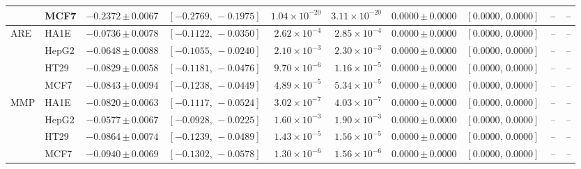 \documentclass[11pt,a4paper]{article}
\begin{document}
\begin{landscape}
\begin{table}[p]
{\begin{tabular}{@{}llrrrrrrrr@{}}
& MCF7
& \(-0.2372\,{\scriptstyle\pm\,0.0067}\)
& \([-0.2769,\,-0.1975]\)
& \(1.04\times10^{-20}\)
& \(3.11\times10^{-20}\)
& \(0.0000\,{\scriptstyle\pm\,0.0000}\)
& \([0.0000,\,0.0000]\)
& \textit{--}
& \textit{--} \\

\midrule

\multirow[c]{4}{*}{ARE}
& HA1E
& \(-0.0736\,{\scriptstyle\pm\,0.0078}\)
& \([-0.1122,\,-0.0350]\)
& \(2.62\times10^{-4}\)
& \(2.85\times10^{-4}\)
& \(0.0000\,{\scriptstyle\pm\,0.0000}\)
& \([0.0000,\,0.0000]\)
& \textit{--}
& \textit{--} \\

& HepG2
& \(-0.0648\,{\scriptstyle\pm\,0.0088}\)
& \([-0.1055,\,-0.0240]\)
& \(2.10\times10^{-3}\)
& \(2.30\times10^{-3}\)
& \(0.0000\,{\scriptstyle\pm\,0.0000}\)
& \([0.0000,\,0.0000]\)
& \textit{--}
& \textit{--} \\

& HT29
& \(-0.0829\,{\scriptstyle\pm\,0.0058}\)
& \([-0.1181,\,-0.0476]\)
& \(9.70\times10^{-6}\)
& \(1.16\times10^{-5}\)
& \(0.0000\,{\scriptstyle\pm\,0.0000}\)
& \([0.0000,\,0.0000]\)
& \textit{--}
& \textit{--} \\

& MCF7
& \(-0.0843\,{\scriptstyle\pm\,0.0094}\)
& \([-0.1238,\,-0.0449]\)
& \(4.89\times10^{-5}\)
& \(5.34\times10^{-5}\)
& \(0.0000\,{\scriptstyle\pm\,0.0000}\)
& \([0.0000,\,0.0000]\)
& \textit{--}
& \textit{--} \\

\midrule

\multirow[c]{4}{*}{MMP}
& HA1E
& \(-0.0820\,{\scriptstyle\pm\,0.0063}\)
& \([-0.1117,\,-0.0524]\)
& \(3.02\times10^{-7}\)
& \(4.03\times10^{-7}\)
& \(0.0000\,{\scriptstyle\pm\,0.0000}\)
& \([0.0000,\,0.0000]\)
& \textit{--}
& \textit{--} \\

& HepG2
& \(-0.0577\,{\scriptstyle\pm\,0.0067}\)
& \([-0.0928,\,-0.0225]\)
& \(1.60\times10^{-3}\)
& \(1.90\times10^{-3}\)
& \(0.0000\,{\scriptstyle\pm\,0.0000}\)
& \([0.0000,\,0.0000]\)
& \textit{--}
& \textit{--} \\

& HT29
& \(-0.0864\,{\scriptstyle\pm\,0.0074}\)
& \([-0.1239,\,-0.0489]\)
& \(1.43\times10^{-5}\)
& \(1.56\times10^{-5}\)
& \(0.0000\,{\scriptstyle\pm\,0.0000}\)
& \([0.0000,\,0.0000]\)
& \textit{--}
& \textit{--} \\

& MCF7
& \(-0.0940\,{\scriptstyle\pm\,0.0069}\)
& \([-0.1302,\,-0.0578]\)
& \(1.30\times10^{-6}\)
& \(1.56\times10^{-6}\)
& \(0.0000\,{\scriptstyle\pm\,0.0000}\)
& \([0.0000,\,0.0000]\)
& \textit{--}
& \textit{--} \\


\end{tabular}}
\end{table}
\end{landscape}
\end{document}
